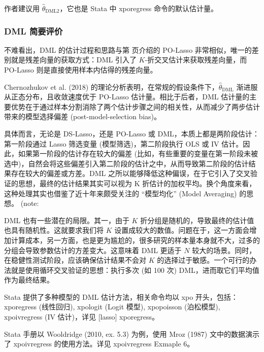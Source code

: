 {作者建议用 $\widehat{\theta}_{\mathrm{DML2}}$，它也是 Stata 中 xporegress 命令的默认估计量。 

\subsubsection{DML 简要评价}
不难看出，DML 的估计过程和思路与第 \pageref{page:lasso-polasso} 页介绍的 PO-Lasso 非常相似，唯一的差别就是残差向量的获取方式：DML 引入了 $K$-折交叉估计来获取残差向量，而 PO-Lasso 则是直接使用样本内估得的残差向量。

Chernozhukov et al. (2018) 的理论分析表明，在常规的假设条件下，$\widehat{\theta}_{\mathrm{DML}}$ 渐进服从正态分布，且收敛速度优于 PO-Lasso 估计量。相比于后者，DML 估计量的主要优势在于通过样本分割消除了两个估计步骤之间的相关性，从而减少了两步估计带来的模型选择偏差 (post-model-selection bias)。

具体而言，无论是 DS-Lasso，还是 PO-Lasso 或 DML，本质上都是两阶段估计：第一阶段通过  Lasso 筛选变量 (模型筛选)，第二阶段执行 OLS 或 IV 估计。因此，如果第一阶段的估计存在较大的偏差 (比如，有些重要的变量在第一阶段未被选中)，自然会将这些偏差引入第二阶段的估计之中，从而导致第二阶段的估计结果存在较大的偏差或方差。DML 之所以能够降低这种偏误，在于它引入了交叉验证的思想，最终的估计结果其实可以视为 K 折估计的加权平均。换个角度来看，这种处理其实也借鉴了近十年来颇受关注的 “模型均化” (Model Averaging) 的思想。 (note: %

DML 也有一些潜在的局限。其一，由于 $K$ 折分组是随机的，导致最终的估计值也具有随机性。这就要求我们将 $K$ 设置成较大的数值。问题在于，这一方面会增加计算成本，另一方面，也是更为尴尬的，很多研究的样本量本身就不大，过多的分组会导致参数估计的方差变大。这意味着 DML 更适于 $N$ 较大的场景。同时，在稳健性测试阶段，应该确保估计结果不会对 $K$ 的选择过于敏感。一个可行的办法就是使用循环交叉验证的思想：执行多次 (如 100 次) DML，进而取它们平均值作为最终结果。


Stata 提供了多种模型的 DML 估计方法，相关命令均以 xpo 开头，包括：xporegress (线性回归), xpologit (Logit 模型), xpopoisson (泊松模型), xpoivregress (IV 估计)，详见 [lasso] xporegress。

Stata 手册以 Wooldridge (2010, ex. 5.3) 为例，使用 Mroz (1987) 文中的数据演示了 xpoivregress 的使用方法。详见 
xpoivregress Exmaple 6。




}
